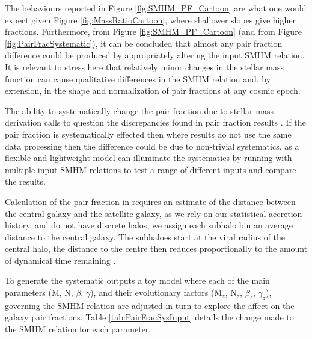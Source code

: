 The behaviours reported in Figure \ref{fig:SMHM_PF_Cartoon} are what one would expect given Figure \ref{fig:MassRatioCartoon}, where shallower slopes give higher fractions. 
Furthermore, from Figure \ref{fig:SMHM_PF_Cartoon} (and from Figure \ref{fig:PairFracSystematic}), it can be concluded that almost any pair fraction difference could be produced by appropriately altering the input SMHM relation. 
It is relevant to stress here that relatively minor changes in the stellar mass function can cause qualitative differences in the SMHM relation and, by extension, in the shape and normalization of pair fractions at any cosmic epoch.

The ability to systematically change the pair fraction due to stellar mass derivation calls to question the discrepancies found in pair fraction results \citep[e.g.][]{Man2016RESOLVING03}. 
If the pair fraction is systematically effected then where results do not use the same data processing then the difference could be due to non-trivial systematics. 
\steel as a flexible and lightweight model can illuminate the systematics by running with multiple input SMHM relations to test a range of different inputs and compare the results.

Calculation of the pair fraction in \steel requires an estimate of the distance between the central galaxy and the satellite galaxy, as we rely on our statistical accretion history, and do not have discrete halos, we assign each subhalo bin an average distance to the central galaxy. 
The subhaloes start at the viral radius of the central halo, the distance to the centre then reduces proportionally to the amount of dynamical time remaining \citep{Guo2011FromCosmology}.

To generate the systematic outputs a toy model where each of the main parameters (M, N, $\beta$, $\gamma$), and their evolutionary factors (M$_z$, N$_z$, $\beta_z$, $\gamma_z$), governing the SMHM relation are adjusted in turn to explore the affect on the galaxy pair fractions. Table \ref{tab:PairFracSysInput} details the change made to the SMHM relation for each parameter. 

